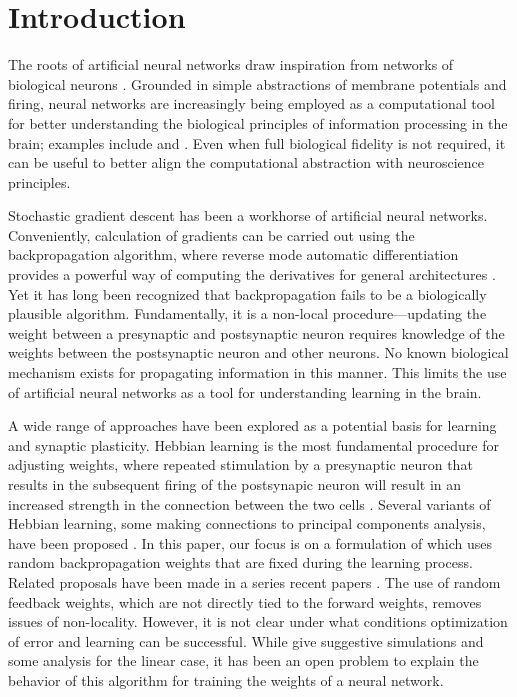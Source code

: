 \section{Introduction}

The roots of artificial neural networks draw inspiration from networks of biological neurons \citep{pdp,pinker,elman,medler}. Grounded in simple abstractions of membrane potentials and firing, neural networks are increasingly being employed as a computational tool for better understanding the biological principles of information processing in the brain; examples include \cite{ilker1} and \cite{yamins2}. Even when full biological fidelity is not required, it can be useful to better align the computational abstraction with neuroscience principles.

Stochastic gradient descent has been a workhorse of artificial neural networks. Conveniently, calculation of gradients can be carried out using the backpropagation algorithm, where reverse mode automatic differentiation provides a powerful way of computing the derivatives for general architectures \citep{rumelhart:86}.
Yet it has long been recognized that backpropagation fails to be a biologically plausible algorithm. Fundamentally, it is a non-local procedure---updating the weight between a presynaptic and postsynaptic neuron requires knowledge of the weights between the postsynaptic neuron and other neurons. No known biological mechanism exists for propagating information in this manner. This limits the use of artificial neural networks as a tool for understanding learning in the brain.

A wide range of approaches have been explored as a potential basis for learning and synaptic plasticity. Hebbian learning is the most fundamental procedure for adjusting weights, where
repeated stimulation by a presynaptic neuron that results in the subsequent
firing of the postsynapic neuron will result in an increased strength in the connection
between the two cells \citep{hebb1,paulsen}. Several variants of Hebbian learning, some making connections to principal components analysis, have been proposed
\citep{oja,sejnowski1,sejnowski2}. In this paper, our focus  is on a formulation of \cite{lillicrap2016random} which uses random
backpropagation weights that are fixed during the learning process.
Related proposals have been made in a series recent papers \citep{akrout,bellec,lillicrap2020backpropagation}.
The use of random feedback weights, which are not directly tied to the forward weights, removes issues of non-locality. However, it is not clear under what conditions optimization of error and learning can be successful. While \citet{lillicrap2016random} give suggestive simulations and some analysis for the linear case, it has been an open problem to explain the behavior of this algorithm for training the weights of a neural network.

